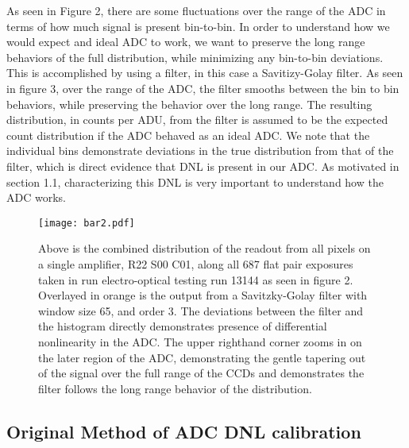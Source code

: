 \documentclass[11pt, letterpaper]{article}
\begin{document}
As seen in Figure 2, there are some fluctuations over the range of the ADC in terms of how much signal is present bin-to-bin. 
In order to understand how we would expect and ideal ADC to work, we want to preserve the long range behaviors of the full distribution, while minimizing any bin-to-bin deviations. 
This is accomplished by using a filter, in this case a Savitizy-Golay filter. 
As seen in figure 3, over the range of the ADC, the filter smooths between the bin to bin behaviors, while preserving the behavior over the long range. 
The resulting distribution, in counts per ADU, from the filter is assumed to be the expected count distribution if the ADC behaved as an ideal ADC.  
We note that the individual bins demonstrate deviations in the true distribution from that of the filter, which is direct evidence that DNL is present in our ADC. 
As motivated in section 1.1, characterizing this DNL is very important to understand how the ADC works. 

\begin{figure}
	\texttt{[image: bar2.pdf]}
	\caption{Above is the combined distribution of the readout from all pixels on a single amplifier, R22 S00 C01, along all 687 flat pair exposures taken in run electro-optical testing run 13144 as seen in figure 2. Overlayed in orange is the output from a Savitzky-Golay filter with window size 65, and order 3. The deviations between the filter and the histogram directly demonstrates presence of differential nonlinearity in the ADC. The upper righthand corner zooms in on the later region of the ADC, demonstrating the gentle tapering out of the signal over the full range of the CCDs and demonstrates the filter follows the long range behavior of the distribution.}
\end{figure}


\subsection{Original Method of ADC DNL calibration}
\indent
\end{document}
